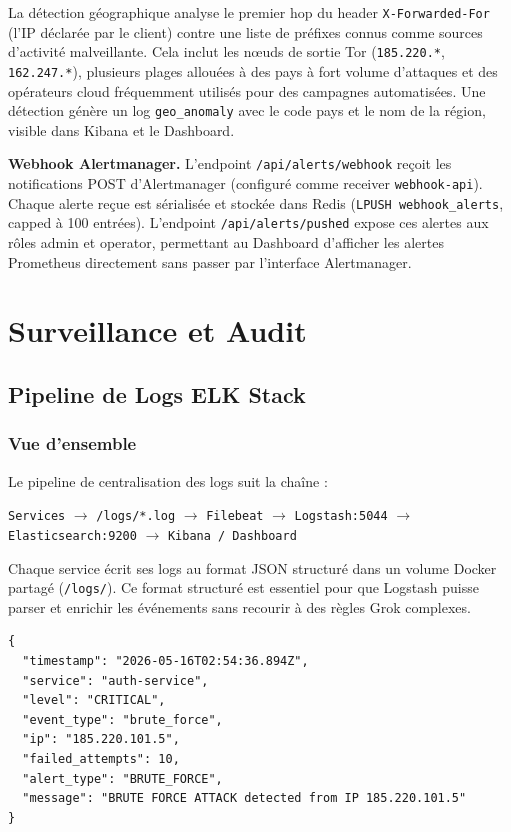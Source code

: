 \documentclass[12pt, a4paper]{report}
\begin{document}
\medskip
La détection géographique analyse le premier hop du header \texttt{X-Forwarded-For} (l'IP déclarée par le client) contre une liste de préfixes connus comme sources d'activité malveillante. Cela inclut les nœuds de sortie Tor (\texttt{185.220.*}, \texttt{162.247.*}), plusieurs plages allouées à des pays à fort volume d'attaques et des opérateurs cloud fréquemment utilisés pour des campagnes automatisées. Une détection génère un log \texttt{geo\_anomaly} avec le code pays et le nom de la région, visible dans Kibana et le Dashboard.

\textbf{Webhook Alertmanager.} L'endpoint \texttt{/api/alerts/webhook} reçoit les notifications POST d'Alertmanager (configuré comme receiver \texttt{webhook-api}). Chaque alerte reçue est sérialisée et stockée dans Redis (\texttt{LPUSH webhook\_alerts}, capped à 100 entrées). L'endpoint \texttt{/api/alerts/pushed} expose ces alertes aux rôles admin et operator, permettant au Dashboard d'afficher les alertes Prometheus directement sans passer par l'interface Alertmanager.

\section{Surveillance et Audit}

\subsection{Pipeline de Logs ELK Stack}

\subsubsection{Vue d'ensemble}

Le pipeline de centralisation des logs suit la chaîne :

\begin{center}
  \texttt{Services} $\rightarrow$ \texttt{/logs/*.log} $\rightarrow$
  \texttt{Filebeat} $\rightarrow$ \texttt{Logstash:5044} $\rightarrow$
  \texttt{Elasticsearch:9200} $\rightarrow$ \texttt{Kibana / Dashboard}
\end{center}

Chaque service écrit ses logs au format JSON structuré dans un volume Docker partagé (\texttt{/logs/}). Ce format structuré est essentiel pour que Logstash puisse parser et enrichir les événements sans recourir à des règles Grok complexes.

\begin{lstlisting}[style=yaml, caption={Exemple de log brute\_force généré par auth-service * format JSON structuré}]
{
  "timestamp": "2026-05-16T02:54:36.894Z",
  "service": "auth-service",
  "level": "CRITICAL",
  "event_type": "brute_force",
  "ip": "185.220.101.5",
  "failed_attempts": 10,
  "alert_type": "BRUTE_FORCE",
  "message": "BRUTE FORCE ATTACK detected from IP 185.220.101.5"
}
\end{lstlisting}
\end{document}
